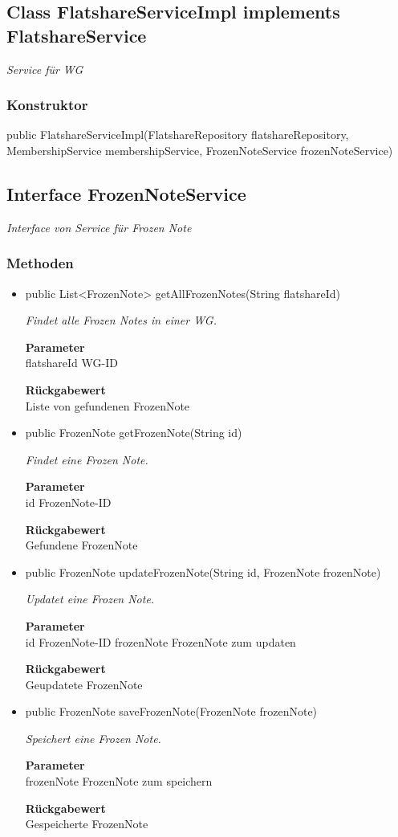 \documentclass[a4paper]{scrreprt}
\begin{document}
    \subsection{Class FlatshareServiceImpl implements FlatshareService}
    \textit{Service für WG}
    \subsubsection{Konstruktor}
    public FlatshareServiceImpl(FlatshareRepository flatshareRepository, MembershipService membershipService, FrozenNoteService frozenNoteService)
    \subsection{Interface FrozenNoteService}
    \textit{Interface von Service für Frozen Note}
    \subsubsection{Methoden}
    \begin{itemize}
    	\item{public List<FrozenNote> getAllFrozenNotes(String flatshareId)}
    	
    	\textit{Findet alle Frozen Notes in einer WG.}
    	
    	\textbf{Parameter} \\
    	flatshareId WG-ID
    	
    	\textbf{Rückgabewert} \\
    	Liste von gefundenen FrozenNote        \item{public FrozenNote getFrozenNote(String id)}
    	
    	\textit{Findet eine Frozen Note.}
    	
    	\textbf{Parameter} \\
    	id FrozenNote-ID
    	
    	\textbf{Rückgabewert} \\
    	Gefundene FrozenNote        \item{public FrozenNote updateFrozenNote(String id, FrozenNote frozenNote)}
    	
    	\textit{Updatet eine Frozen Note.}
    	
    	\textbf{Parameter} \\
    	id FrozenNote-ID
    	frozenNote FrozenNote zum updaten
    	
    	\textbf{Rückgabewert} \\
    	Geupdatete FrozenNote        \item{public FrozenNote saveFrozenNote(FrozenNote frozenNote)}
    	
    	\textit{Speichert eine Frozen Note.}
    	
    	\textbf{Parameter} \\
    	frozenNote FrozenNote zum speichern
    	
    	\textbf{Rückgabewert} \\
    	Gespeicherte FrozenNote
    \end{itemize}
\end{document}
